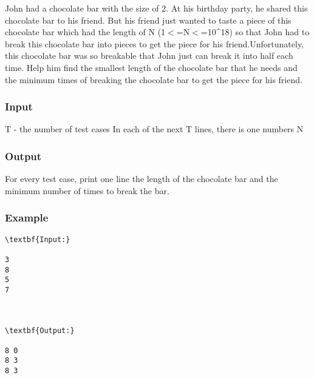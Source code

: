 

John had a chocolate bar with the size of 2\textasciicircumi. At his birthday party, he shared this chocolate bar to his friend. But his friend just wanted to taste a piece of this chocolate bar which had the length of N (1$<$=N$<$=10\textasciicircum18) so that John had to break this chocolate bar into pieces to get the piece for his friend.Unfortunately, this chocolate bar was so breakable that John just can break it into half each time. 
Help him find the smallest length of the chocolate bar that he needs and the minimum times of breaking the chocolate bar to get the piece for his friend.

\subsubsection{Input}

T - the number of test cases
In each of the next T lines, there is one numbers N

\subsubsection{Output}

For every test case, print one line the length of the chocolate bar and the minimum number of times to break the bar.

\subsubsection{Example}
\begin{verbatim}
\textbf{Input:}

3
8
5
7



\textbf{Output:}

8 0
8 3
8 3

\end{verbatim}
